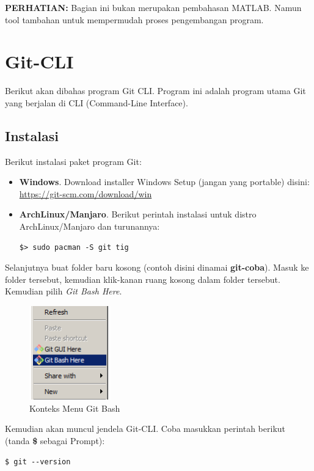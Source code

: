 \documentclass[12pt]{book}
\begin{document}
	\textbf{PERHATIAN:} Bagian ini bukan merupakan pembahasan MATLAB.
	Namun tool tambahan untuk mempermudah proses pengembangan program.

	\section{Git-CLI}

	Berikut akan dibahas program Git CLI.
	Program ini adalah program utama Git yang berjalan di CLI (Command-Line Interface).

	\subsection{Instalasi}

	Berikut instalasi paket program Git:
	\begin{itemize}
		\item \textbf{Windows}. Download installer Windows Setup (jangan yang portable) disini:\\
		\url{https://git-scm.com/download/win}

		\item \textbf{ArchLinux/Manjaro}. Berikut perintah instalasi untuk distro ArchLinux/Manjaro dan turunannya:
		\begin{verbatim}
$> sudo pacman -S git tig
		\end{verbatim}
	\end{itemize}

	Selanjutnya buat folder baru kosong (contoh disini dinamai \textbf{git-coba}).
	Masuk ke folder tersebut, kemudian klik-kanan ruang kosong dalam folder tersebut.
	Kemudian pilih \textit{Git Bash Here}.

	\begin{figure}[!ht]
		\centering
		\includegraphics[width=100pt]{images/githere0}
		\caption{Konteks Menu Git Bash}
	\end{figure}

	\newpage
	Kemudian akan muncul jendela Git-CLI.
	Coba masukkan perintah berikut (tanda \textbf{\$} sebagai Prompt):
	\begin{verbatim}
$ git --version
	\end{verbatim}
\end{document}
